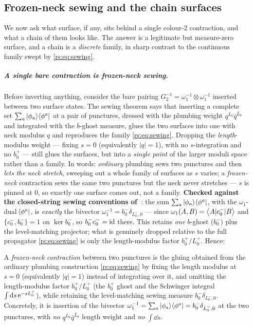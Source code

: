 \subsection{Frozen-neck sewing and the chain surfaces}
\label{rs:sec:frozen}

We now ask what surface, if any, sits behind a single colour-2 contraction, and
what a chain of them looks like. The answer is a legitimate but measure-zero
surface, and a chain is a \emph{discrete} family, in sharp contrast to the
continuous family swept by \eqref{rs:eq:sewing}.

\subparagraph{A single bare contraction is frozen-neck sewing.} Before inverting
anything, consider the bare pairing $G_2^{-1}=\omega_1^{-1}\otimes\omega_1^{-1}$
inserted between two surface states. The sewing theorem says that inserting a
complete set $\sum_a\ket{\phi_a}\mathinner{{}_{}\hspace{-2pt}\langle \phi^a |}$ at a pair of punctures, dressed with
the plumbing weight $q^{L_0}\bar q^{\bar L_0}$ and integrated with the $b$-ghost
measure, glues the two surfaces into one with neck modulus $q$ and reproduces the
family \eqref{rs:eq:sewing}. Dropping the \emph{length}-modulus weight --- fixing
$s=0$ (equivalently $|q|=1$), with no $s$-integration and no $b_0^+$ --- still
glues the surfaces, but into a \emph{single point} of the larger moduli space
rather than a family. In words: \emph{ordinary} plumbing sews two punctures and
then \emph{lets the neck stretch}, sweeping out a whole family of surfaces as $s$
varies; a \emph{frozen-neck} contraction sews the same two punctures but the neck
never stretches --- $s$ is pinned at $0$, so exactly one surface comes out, not a
family. \textbf{Checked against the closed-string sewing conventions of~\cite{Erbin:2021:StringFieldTheory}}:
the sum $\sum_a\ket{\phi_a}\mathinner{{}_{}\hspace{-2pt}\langle \phi^a |}$, with the $\omega_1$-dual $\mathinner{{}_{}\hspace{-2pt}\langle \phi^a |}$,
is \emph{exactly} the bivector $\omega_1^{-1}=b_0^-\delta_{L_0^-,0}$ --- since
$\omega_1(A,B)=\left \langle A|c_0^-|B \right \rangle$ and $\{c_0^-,b_0^-\}=1$ on $\ker b_0^-$, so
$b_0^-c_0^-=\mathrm{id}$ there. This retains \emph{one} $b$-ghost ($b_0^-$) plus the
level-matching projector; what is genuinely dropped relative to the full
propagator \eqref{rs:eq:sewing} is only the length-modulus factor $b_0^+/L_0^+$.
Hence:
\begin{definition}
	\label{rs:def:frozenneck}
	A \emph{frozen-neck contraction} between two punctures is the gluing obtained
	from the ordinary plumbing construction \eqref{rs:eq:sewing} by fixing the length
	modulus at $s=0$ (equivalently $|q|=1$) instead of integrating over it, and
	omitting the length-modulus factor $b_0^+/L_0^+$ (the $b_0^+$ ghost and the
	Schwinger integral $\int\mathrm{d} s\,\mathrm{e}^{-sL_0^+}$), while retaining the
	level-matching sewing measure $b_0^-\delta_{L_0^-,0}$. Concretely, it is
	insertion of the bivector
	$\omega_1^{-1}=\sum_a\ket{\phi_a}\mathinner{{}_{}\hspace{-2pt}\langle \phi^a |}=b_0^-\delta_{L_0^-,0}$ at the two
	punctures, with \emph{no} $q^{L_0}\bar q^{\bar L_0}$ length weight and
	\emph{no} $\int\dd s$.
\end{definition}
